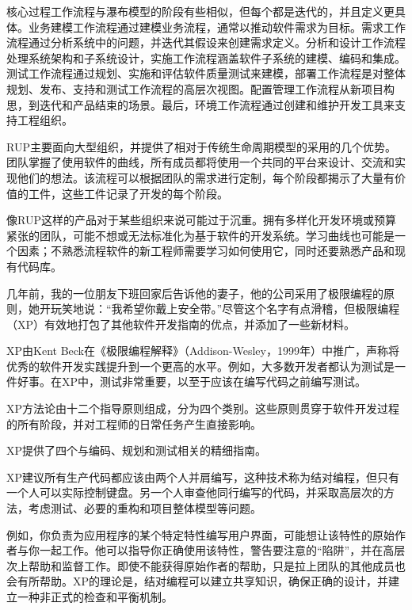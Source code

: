 核心过程工作流程与瀑布模型的阶段有些相似，但每个都是迭代的，并且定义更具体。业务建模工作流程通过建模业务流程，通常以推动软件需求为目标。需求工作流程通过分析系统中的问题，并迭代其假设来创建需求定义。分析和设计工作流程处理系统架构和子系统设计，实施工作流程涵盖软件子系统的建模、编码和集成。测试工作流程通过规划、实施和评估软件质量测试来建模，部署工作流程是对整体规划、发布、支持和测试工作流程的高层次视图。配置管理工作流程从新项目构思，到迭代和产品结束的场景。最后，环境工作流程通过创建和维护开发工具来支持工程组织。


RUP主要面向大型组织，并提供了相对于传统生命周期模型的采用的几个优势。团队掌握了使用软件的曲线，所有成员都将使用一个共同的平台来设计、交流和实现他们的想法。该流程可以根据团队的需求进行定制，每个阶段都揭示了大量有价值的工件，这些工件记录了开发的每个阶段。

像RUP这样的产品对于某些组织来说可能过于沉重。拥有多样化开发环境或预算紧张的团队，可能不想或无法标准化为基于软件的开发系统。学习曲线也可能是一个因素；不熟悉流程软件的新工程师需要学习如何使用它，同时还要熟悉产品和现有代码库。


几年前，我的一位朋友下班回家后告诉他的妻子，他的公司采用了极限编程的原则，她开玩笑地说：“我希望你戴上安全带。”尽管这个名字有点滑稽，但极限编程（XP）有效地打包了其他软件开发指南的优点，并添加了一些新材料。

XP由Kent Beck在《极限编程解释》（Addison-Wesley，1999年）中推广，声称将优秀的软件开发实践提升到一个更高的水平。例如，大多数开发者都认为测试是一件好事。在XP中，测试非常重要，以至于应该在编写代码之前编写测试。


XP方法论由十二个指导原则组成，分为四个类别。这些原则贯穿于软件开发过程的所有阶段，并对工程师的日常任务产生直接影响。


XP提供了四个与编码、规划和测试相关的精细指南。


XP建议所有生产代码都应该由两个人并肩编写，这种技术称为结对编程，但只有一个人可以实际控制键盘。另一个人审查他同行编写的代码，并采取高层次的方法，考虑测试、必要的重构和项目整体模型等问题。

例如，你负责为应用程序的某个特定特性编写用户界面，可能想让该特性的原始作者与你一起工作。他可以指导你正确使用该特性，警告要注意的“陷阱”，并在高层次上帮助和监督工作。即使不能获得原始作者的帮助，只是拉上团队的其他成员也会有所帮助。XP的理论是，结对编程可以建立共享知识，确保正确的设计，并建立一种非正式的检查和平衡机制。

